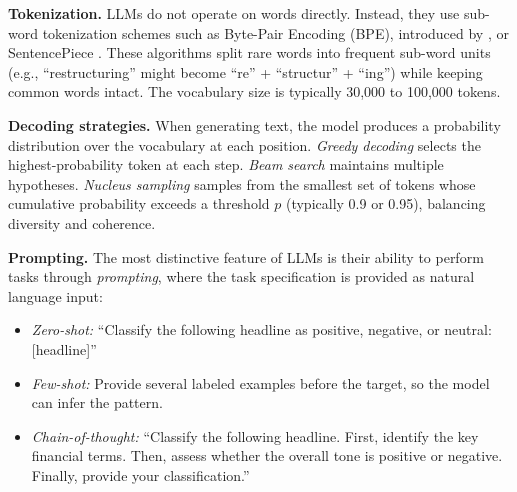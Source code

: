 \textbf{Tokenization.} LLMs do not operate on words directly. Instead, they use sub-word tokenization schemes such as Byte-Pair Encoding (BPE), introduced by \cite{sennrich2016neural}, or SentencePiece \citep{kudo2018sentencepiece}. These algorithms split rare words into frequent sub-word units (e.g., ``restructuring'' might become ``re'' + ``structur'' + ``ing'') while keeping common words intact. The vocabulary size is typically 30,000 to 100,000 tokens.

\textbf{Decoding strategies.} When generating text, the model produces a probability distribution over the vocabulary at each position. \textit{Greedy decoding} selects the highest-probability token at each step. \textit{Beam search} maintains multiple hypotheses. \textit{Nucleus sampling} \citep{holtzman2020curious} samples from the smallest set of tokens whose cumulative probability exceeds a threshold $p$ (typically 0.9 or 0.95), balancing diversity and coherence.

\textbf{Prompting.} The most distinctive feature of LLMs is their ability to perform tasks through \textit{prompting}, where the task specification is provided as natural language input:

\begin{itemize}
\item \textit{Zero-shot:} ``Classify the following headline as positive, negative, or neutral: [headline]''
\item \textit{Few-shot:} Provide several labeled examples before the target, so the model can infer the pattern.
\item \textit{Chain-of-thought:} ``Classify the following headline. First, identify the key financial terms. Then, assess whether the overall tone is positive or negative. Finally, provide your classification.''
\end{itemize}

